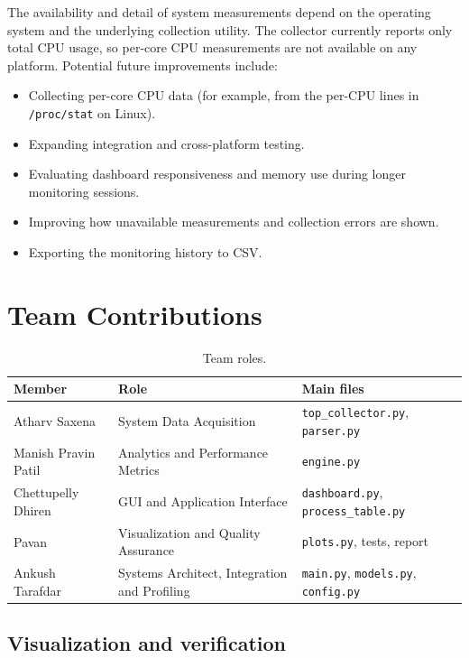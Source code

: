 \documentclass[11pt,a4paper]{article}
\begin{document}
The availability and detail of system measurements depend on the operating
system and the underlying collection utility. The collector currently reports
only total CPU usage, so per-core CPU measurements are not available on any
platform. Potential future improvements include:
\begin{itemize}
    \item Collecting per-core CPU data (for example, from the per-CPU lines in
          \texttt{/proc/stat} on Linux).
    \item Expanding integration and cross-platform testing.
    \item Evaluating dashboard responsiveness and memory use during longer
          monitoring sessions.
    \item Improving how unavailable measurements and collection errors are
          shown.
    \item Exporting the monitoring history to CSV.
\end{itemize}

\section{Team Contributions}

\begin{table}[H]
\centering
\footnotesize
\begin{tabular}{lll}
\toprule
\textbf{Member} & \textbf{Role} & \textbf{Main files} \\
\midrule
Atharv Saxena & System Data Acquisition & \texttt{top\_collector.py}, \texttt{parser.py} \\
Manish Pravin Patil & Analytics and Performance Metrics & \texttt{engine.py} \\
Chettupelly Dhiren & GUI and Application Interface & \texttt{dashboard.py}, \texttt{process\_table.py} \\
Pavan & Visualization and Quality Assurance & \texttt{plots.py}, tests, report \\
Ankush Tarafdar & Systems Architect, Integration and Profiling & \texttt{main.py}, \texttt{models.py}, \texttt{config.py} \\
\bottomrule
\end{tabular}
\caption{Team roles.}
\end{table}

\subsection{Visualization and verification}
\end{document}
